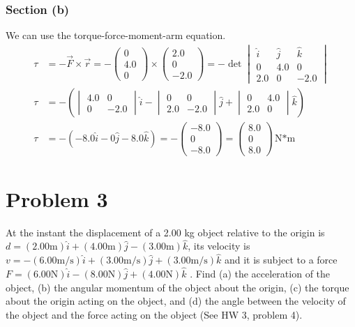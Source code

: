 \documentclass[12pt]{article}
\begin{document}
\subsubsection{Section (b)}
We can use the torque-force-moment-arm equation.
\begin{align}
    \tau    &=  -\vec{F} \times \vec{r}
        =   -\begin{pmatrix} 0 \\ 4.0 \\ 0 \end{pmatrix} \times \begin{pmatrix} 2.0 \\ 0 \\ -2.0 \end{pmatrix}
        =   -\det\begin{vmatrix}
            \hat{i} &\hat{j}&\hat{k}\\
            0       &4.0    &0      \\
            2.0     &0      &-2.0
        \end{vmatrix}\\
    \tau    &=  -\left(
                \begin{vmatrix}4.0&0\\0&-2.0\end{vmatrix}\hat{i} - 
                \begin{vmatrix}0&0\\2.0&-2.0\end{vmatrix}\hat{j} + 
                \begin{vmatrix}0&4.0\\2.0&0\end{vmatrix}\hat{k}
                \right)\\
    \tau    &=  -(-8.0\hat{i} - 0\hat{j} - 8.0\hat{k})
        =   -\begin{pmatrix}-8.0\\0\\-8.0\end{pmatrix}
        =   \boxed{\begin{pmatrix}8.0\\0\\8.0\end{pmatrix}\unit{\newton*\meter}}
\end{align}

\pagebreak
\section{Problem 3}
At the instant the displacement of a 2.00 kg object relative to the origin is \(d = (2.00 \unit{\meter})\hat{i} + (4.00 \unit{\meter})\hat{j} - (3.00 \unit{\meter})\hat{k}\), its velocity is \(v = -(6.00 \unit{\meter/\second})\hat{i} + (3.00 \unit{\meter/\second})\hat{j} + (3.00 \unit{\meter/\second})\hat{k}\) and it is subject to a force \(F = (6.00 \unit{\newton})\hat{i} - (8.00 \unit{\newton})\hat{j} + (4.00 \unit{\newton})\hat{k}\) . Find (a) the acceleration of the object, (b) the angular momentum of the object about the origin, (c) the torque about the origin acting on the object, and (d) the angle between the velocity of the object and the force acting on the object (See HW 3, problem 4).
\end{document}
